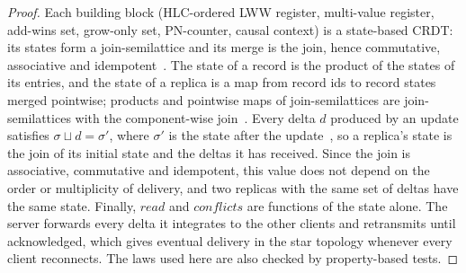 \begin{proof}
Each building block (HLC-ordered LWW register, multi-value register, add-wins set, grow-only set, PN-counter, causal
context) is a state-based CRDT: its states form a join-semilattice and its merge is the join, hence commutative,
associative and idempotent~\cite{shapiro2011comprehensive,almeida2018delta}. The state of a record is the product of
the states of its entries, and the state of a replica is a map from record ids to record states merged pointwise;
products and pointwise maps of join-semilattices are join-semilattices with the component-wise
join~\cite{shapiro2011crdt}. Every delta $d$ produced by an update satisfies $\sigma \sqcup d = \sigma'$, where
$\sigma'$ is the state after the update~\cite{almeida2018delta}, so a replica's state is the join of its initial
state and the deltas it has received. Since the join is associative, commutative and idempotent, this value does not
depend on the order or multiplicity of delivery, and two replicas with the same set of deltas have the same state.
Finally, $\mathit{read}$ and $\mathit{conflicts}$ are functions of the state alone. The server forwards every delta
it integrates to the other clients and retransmits until acknowledged, which gives eventual delivery in the star
topology whenever every client reconnects. The laws used here are also checked by property-based tests.
\end{proof}
